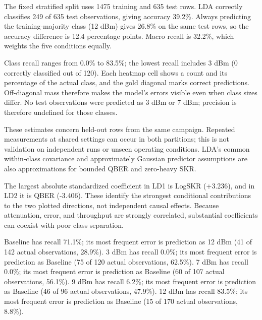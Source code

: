 The fixed stratified split uses 1475 training and 635 test rows. LDA correctly classifies 249 of 635 test observations, giving accuracy 39.2\%. Always predicting the training-majority class (12 dBm) gives 26.8\% on the same test rows, so the accuracy difference is 12.4 percentage points. Macro recall is 32.2\%, which weights the five conditions equally.

Class recall ranges from 0.0\% to 83.5\%; the lowest recall includes 3 dBm (0 correctly classified out of 120). Each heatmap cell shows a count and its percentage of the actual class, and the gold diagonal marks correct predictions. Off-diagonal mass therefore makes the model's errors visible even when class sizes differ. No test observations were predicted as 3 dBm or 7 dBm; precision is therefore undefined for those classes.

These estimates concern held-out rows from the same campaign. Repeated measurements at shared settings can occur in both partitions; this is not validation on independent runs or unseen operating conditions. LDA's common within-class covariance and approximately Gaussian predictor assumptions are also approximations for bounded QBER and zero-heavy SKR.


The largest absolute standardized coefficient in LD1 is LogSKR (+3.236), and in LD2 it is QBER (-3.406). These identify the strongest conditional contributions to the two plotted directions, not independent causal effects. Because attenuation, error, and throughput are strongly correlated, substantial coefficients can coexist with poor class separation.


Baseline has recall 71.1\%; its most frequent error is prediction as 12 dBm (41 of 142 actual observations, 28.9\%). 3 dBm has recall 0.0\%; its most frequent error is prediction as Baseline (75 of 120 actual observations, 62.5\%). 7 dBm has recall 0.0\%; its most frequent error is prediction as Baseline (60 of 107 actual observations, 56.1\%). 9 dBm has recall 6.2\%; its most frequent error is prediction as Baseline (46 of 96 actual observations, 47.9\%). 12 dBm has recall 83.5\%; its most frequent error is prediction as Baseline (15 of 170 actual observations, 8.8\%).
